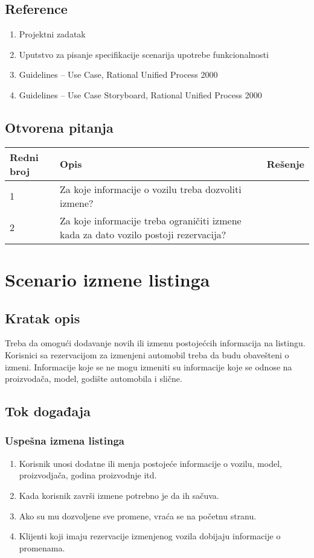 \documentclass[12pt]{article}
\begin{document}
\subsection{Reference}
\begin{enumerate}
   \item Projektni zadatak
   \item Uputstvo za pisanje specifikacije scenarija upotrebe funkcionalnosti
   \item  Guidelines – Use Case, Rational Unified Process 2000
   \item  Guidelines – Use Case Storyboard, Rational Unified Process 2000
 \end{enumerate}
\subsection{Otvorena pitanja}


\begin{center}
\begin{tabular}{ | m{2cm} | m{7cm}| m{7cm} | } 
\hline
Redni broj& Opis & Rešenje \\ 
\hline
1 & Za koje informacije o vozilu treba dozvoliti izmene? & \\
\hline
2 & Za koje informacije treba ograničiti izmene kada za dato vozilo postoji rezervacija? & \\
\hline
\end{tabular}
\end{center}

    

\section{Scenario izmene listinga}
\subsection{Kratak opis}
Treba da omogući dodavanje novih ili izmenu postojećcih informacija na listingu.
Korisnici sa rezervacijom za izmenjeni automobil treba da budu obavešteni o izmeni.
Informacije koje se ne mogu izmeniti su informacije koje se odnose na proizvodača,
model, godište automobila i slične.
\subsection{Tok događaja}

\subsubsection{Uspešna izmena listinga}
\begin{enumerate}
    \item Korisnik unosi dodatne ili menja postojeće informacije o vozilu, model, proizvodjača, godina proizvodnje itd.
    \item Kada korisnik završi izmene potrebno je da ih sačuva.
    \item Ako su mu dozvoljene sve promene, vraća se na početnu stranu.
    \item Klijenti koji imaju rezervacije izmenjenog vozila dobijaju informacije o promenama.
\end{enumerate}
\end{document}
